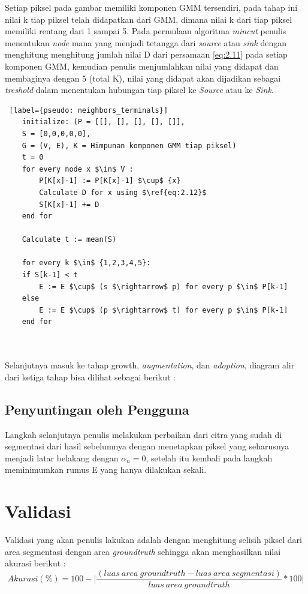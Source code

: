 Setiap piksel pada gambar memiliki komponen GMM tersendiri, pada tahap ini nilai k
tiap piksel telah didapatkan dari GMM, dimana nilai k dari tiap piksel memiliki rentang
dari 1 sampai 5. Pada permulaan algoritma \emph{mincut} penulis menentukan \emph{node}
mana yang menjadi tetangga dari \emph{source} atau \emph{sink} dengan menghitung
menghitung jumlah nilai D dari persamaan \ref{eq:2.11} pada setiap komponen GMM, 
kemudian penulis menjumlahkan nilai yang didapat dan membaginya dengan 5 (total K),
nilai yang didapat akan dijadikan sebagai \emph{treshold} dalam menentukan hubungan
tiap piksel ke \emph{Source} atau ke \emph{Sink}.

\begin{lstlisting} [label={pseudo: neighbors_terminals}]
	initialize: (P = [[], [], [], [], []], 
	S = [0,0,0,0,0], 
	G = (V, E), K = Himpunan komponen GMM tiap piksel)
	t = 0
	for every node x $\in$ V : 
		P[K[x]-1] := P[K[x]-1] $\cup$ {x}
		Calculate D for x using $\ref{eq:2.12}$
		S[K[x]-1] += D
	end for

	Calculate t := mean(S)

	for every k $\in$ {1,2,3,4,5}:
	if S[k-1] < t
		E := E $\cup$ (s $\rightarrow$ p) for every p $\in$ P[k-1]
	else
		E := E $\cup$ (p $\rightarrow$ t) for every p $\in$ P[k-1]
	end for

	
  \end{lstlisting}

Selanjutnya masuk ke tahap growth, \emph{augmentation}, dan \emph{adoption}, diagram alir
dari ketiga tahap bisa dilihat sebagai berikut :






\subsection{Penyuntingan oleh Pengguna}
Langkah selanjutnya penulis melakukan perbaikan dari citra yang sudah di segmentasi
dari hasil sebelumnya dengan menetapkan piksel yang seharusnya menjadi latar belakang
dengan \(\alpha_{n} = 0\), setelah itu kembali pada langkah meminimumkan rumus E yang hanya
dilakukan sekali.

\section{Validasi}
Validasi yang akan penulis lakukan adalah dengan menghitung selisih piksel dari area
segmentasi dengan area \emph{groundtruth} sehingga akan menghasilkan nilai akurasi berikut :
\begin{equation} \label{eq:3.3}
	Akurasi(\%) = 100 - \bigg | \frac{(luas \: area \: groundtruth - luas \: area \: segmentasi)}{luas \: area \: groundtruth} * 100 \bigg |
\end{equation}
